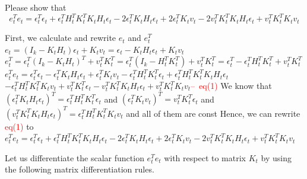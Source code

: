 \documentclass[a4 paper]{article}
\begin{document}
\begin{tcolorbox}[colback=RubineRed!5!white,colframe=RubineRed!75!black]
    Please show that 
    \begin{equation}
        e_t^Te_t=\epsilon_t^T\epsilon_t+\epsilon_t^TH_t^TK_t^TK_tH_t\epsilon_t-2\epsilon_t^TK_tH_t\epsilon_t+2\epsilon_t^TK_tv_t-2v_t^TK_t^TK_tH_t\epsilon_t+v_t^TK_t^TK_tv_t
    \end{equation}
\end{tcolorbox}
\begin{tcolorbox}[colback=YellowGreen!5!white,colframe=YellowGreen!75!black,title={Problem 1's answer}]
    First, we calculate and rewrite $e_t$ and $e_t^T$\newline
    $e_t=(I_k-K_tH_t)\epsilon_t+K_tv_t=\epsilon_t-K_tH_t\epsilon_t+K_tv_t$ \newline
    $e_t^T=\epsilon_t^T(I_k-K_tH_t)^T+v_t^TK_t^T=\epsilon_t^T(I_k-H_t^TK_t^T)+v_t^TK_t^T=\epsilon_t^T-\epsilon_t^TH_t^TK_t^T+v_t^TK_t^T$\newline
    \newline
    $e_t^Te_t=\epsilon_t^T\epsilon_t-\epsilon_t^TK_tH_t\epsilon_t+\epsilon_t^TK_tv_t-\epsilon_t^TH_t^TK_t^T\epsilon_t+\epsilon_t^TH_t^TK_t^TK_tH_t\epsilon_t$\newline
    \hspace*{0.5cm}$-\epsilon_t^TH_t^TK_t^TK_tv_t+v_t^TK_t^T\epsilon_t-v_t^TK_t^TK_tH_t\epsilon_t+v_t^TK_t^TK_tv_t$\hspace*{0.2cm}\textcolor{red}{--\ eq(1)}\newline
    \newline
    We know that $\left(\epsilon_t^TK_tH_t\epsilon_t\right)^T=\epsilon_t^TH_t^TK_t^T\epsilon_t$ and $\left(\epsilon_t^TK_tv_t\right)^T=v_t^TK_t^T\epsilon_t$\newline
    \hspace*{0.5cm}and $\left(v_t^TK_t^TK_tH_t\epsilon_t\right)^T=\epsilon_t^TH_t^TK_t^TK_tv_t$ and all of them are const\newline
    \newline
    Hence, we can rewrite \textcolor{red}{eq(1)} to \newline
    $e_t^Te_t=\epsilon_t^T\epsilon_t+\epsilon_t^TH_t^TK_t^TK_tH_t\epsilon_t-2\epsilon_t^TK_tH_t\epsilon_t+2\epsilon_t^TK_tv_t-2v_t^TK_t^TK_tH_t\epsilon_t+v_t^TK_t^TK_tv_t$
\end{tcolorbox}
\clearpage
Let us differentiate the scalar function $e_t^Te_t$ with respect to matrix $K_t$ by using the following matrix differentiation rules.
\end{document}

